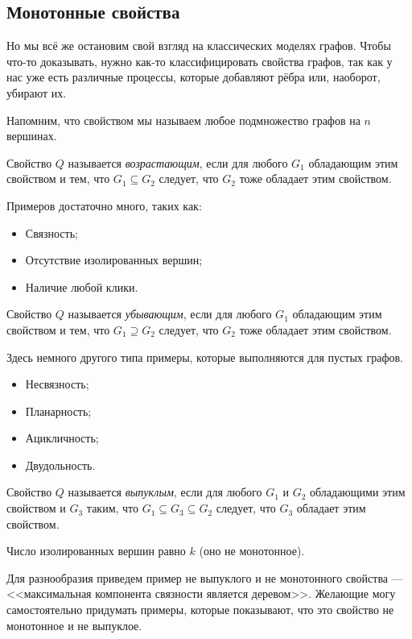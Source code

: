 \subsection{Монотонные свойства}

Но мы всё же остановим свой взгляд на классических моделях графов. Чтобы
что-то доказывать, нужно как-то классифицировать свойства графов, так как у нас
уже есть различные процессы, которые добавляют рёбра или, наоборот, убирают их.

Напомним, что свойством мы называем любое подмножество графов на $n$ вершинах.

\begin{definition}
  Свойство $Q$ называется \textit{возрастающим}, если для любого $G_1$ обладающим
  этим свойством и тем, что $G_1 \subseteq G_2$ следует, что $G_2$ тоже обладает
  этим свойством.
\end{definition}

\begin{example}
  Примеров достаточно много, таких как:
  \begin{itemize}
    \item Связность;
    \item Отсутствие изолированных вершин;
    \item Наличие любой клики.
  \end{itemize}
\end{example}

\begin{definition}
  Свойство $Q$ называется \textit{убывающим}, если для любого $G_1$ обладающим
  этим свойством и тем, что $G_1 \supseteq G_2$ следует, что $G_2$ тоже обладает
  этим свойством.
\end{definition}

\begin{example}
  Здесь немного другого типа примеры, которые выполняются для пустых графов.
  \begin{itemize}
    \item Несвязность;
    \item Планарность;
    \item Ацикличность;
    \item Двудольность.
  \end{itemize}
\end{example}

\begin{definition}
  Свойство $Q$ называется \textit{выпуклым}, если для любого $G_1$ и $G_2$ обладающими
  этим свойством и $G_3$ таким, что $G_1 \subseteq G_3 \subseteq G_2$ следует,
  что $G_3$ обладает этим свойством.
\end{definition}

\begin{example}
  Число изолированных вершин равно $k$ (оно не монотонное).
\end{example}

Для разнообразия приведем пример не выпуклого и не монотонного свойства --- 
<<максимальная компонента связности является деревом>>. Желающие могу самостоятельно
придумать примеры, которые показывают, что это свойство не монотонное и не выпуклое.

